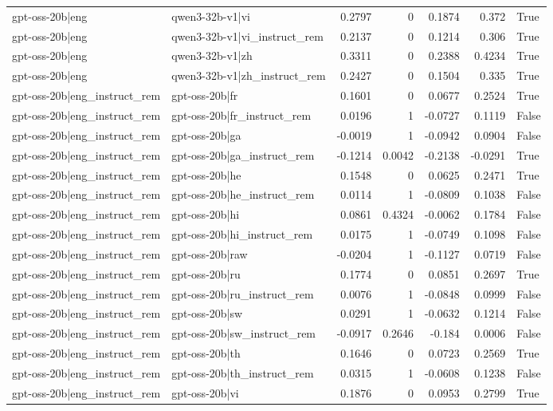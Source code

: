 \begin{table}
\begin{tabular}{l l r r r r l}
gpt-oss-20b|eng & qwen3-32b-v1|vi & 0.2797 & 0 & 0.1874 & 0.372 & True \\
gpt-oss-20b|eng & qwen3-32b-v1|vi_instruct_rem & 0.2137 & 0 & 0.1214 & 0.306 & True \\
gpt-oss-20b|eng & qwen3-32b-v1|zh & 0.3311 & 0 & 0.2388 & 0.4234 & True \\
gpt-oss-20b|eng & qwen3-32b-v1|zh_instruct_rem & 0.2427 & 0 & 0.1504 & 0.335 & True \\
gpt-oss-20b|eng_instruct_rem & gpt-oss-20b|fr & 0.1601 & 0 & 0.0677 & 0.2524 & True \\
gpt-oss-20b|eng_instruct_rem & gpt-oss-20b|fr_instruct_rem & 0.0196 & 1 & -0.0727 & 0.1119 & False \\
gpt-oss-20b|eng_instruct_rem & gpt-oss-20b|ga & -0.0019 & 1 & -0.0942 & 0.0904 & False \\
gpt-oss-20b|eng_instruct_rem & gpt-oss-20b|ga_instruct_rem & -0.1214 & 0.0042 & -0.2138 & -0.0291 & True \\
gpt-oss-20b|eng_instruct_rem & gpt-oss-20b|he & 0.1548 & 0 & 0.0625 & 0.2471 & True \\
gpt-oss-20b|eng_instruct_rem & gpt-oss-20b|he_instruct_rem & 0.0114 & 1 & -0.0809 & 0.1038 & False \\
gpt-oss-20b|eng_instruct_rem & gpt-oss-20b|hi & 0.0861 & 0.4324 & -0.0062 & 0.1784 & False \\
gpt-oss-20b|eng_instruct_rem & gpt-oss-20b|hi_instruct_rem & 0.0175 & 1 & -0.0749 & 0.1098 & False \\
gpt-oss-20b|eng_instruct_rem & gpt-oss-20b|raw & -0.0204 & 1 & -0.1127 & 0.0719 & False \\
gpt-oss-20b|eng_instruct_rem & gpt-oss-20b|ru & 0.1774 & 0 & 0.0851 & 0.2697 & True \\
gpt-oss-20b|eng_instruct_rem & gpt-oss-20b|ru_instruct_rem & 0.0076 & 1 & -0.0848 & 0.0999 & False \\
gpt-oss-20b|eng_instruct_rem & gpt-oss-20b|sw & 0.0291 & 1 & -0.0632 & 0.1214 & False \\
gpt-oss-20b|eng_instruct_rem & gpt-oss-20b|sw_instruct_rem & -0.0917 & 0.2646 & -0.184 & 0.0006 & False \\
gpt-oss-20b|eng_instruct_rem & gpt-oss-20b|th & 0.1646 & 0 & 0.0723 & 0.2569 & True \\
gpt-oss-20b|eng_instruct_rem & gpt-oss-20b|th_instruct_rem & 0.0315 & 1 & -0.0608 & 0.1238 & False \\
gpt-oss-20b|eng_instruct_rem & gpt-oss-20b|vi & 0.1876 & 0 & 0.0953 & 0.2799 & True \\

\end{tabular}
\end{table}
